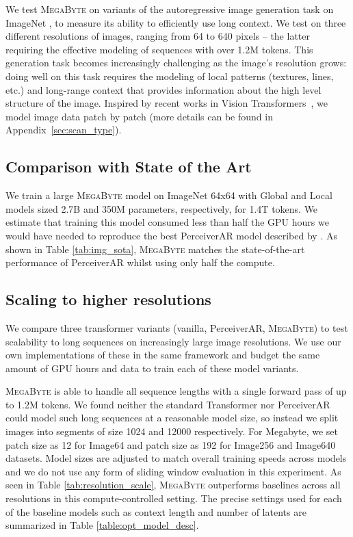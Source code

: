 We test \textsc{MegaByte} on variants of the autoregressive image generation task on ImageNet \citep{Oord2016PixelNetworks}, to measure its ability to efficiently use long context. We test on three different resolutions of images, ranging from 64 to 640 pixels -- the latter requiring the effective modeling of sequences with over 1.2M tokens. This generation task becomes increasingly challenging as the image's resolution grows: doing well on this task requires the modeling of local patterns (textures, lines, etc.) and long-range context that provides information about the high level structure of the image. Inspired by recent works in Vision Transformers~\citep{vit}, we model image data patch by patch (more details can be found in Appendix~\ref{sec:scan_type}). 

\subsection{Comparison with State of the Art}

We train a large \textsc{MegaByte} model on ImageNet 64x64 with Global and Local models sized 2.7B and 350M parameters, respectively, for 1.4T tokens. We estimate that training this model consumed less than half the GPU hours we would have needed to reproduce the best PerceiverAR model described by \citep{perceiverar}. As shown in Table \ref{tab:img_sota}, \textsc{MegaByte} matches the state-of-the-art performance of PerceiverAR whilst using only half the compute.

\subsection{Scaling to higher resolutions}

We compare three transformer variants (vanilla, PerceiverAR, \textsc{MegaByte}) to test scalability to long sequences on increasingly large image resolutions. We use our own implementations of these in the same framework and budget the same amount of GPU hours and data to train each of these model variants. 

\textsc{MegaByte} is able to handle all sequence lengths with a single forward pass of up to 1.2M tokens. We found neither the standard Transformer nor PerceiverAR could model such long sequences at a reasonable model size, so instead we split images into segments of size 1024 and 12000 respectively. For Megabyte, we set patch size as 12 for Image64 and patch size as 192 for Image256 and Image640 datasets. Model sizes are adjusted to match overall training speeds across models and we do not use any form of sliding window evaluation in this experiment. As seen in Table \ref{tab:resolution_scale}, \textsc{MegaByte} outperforms baselines across all resolutions in this compute-controlled setting. The precise settings used for each of the baseline models  such as context length and number of latents are summarized in Table \ref{table:opt_model_desc}.


